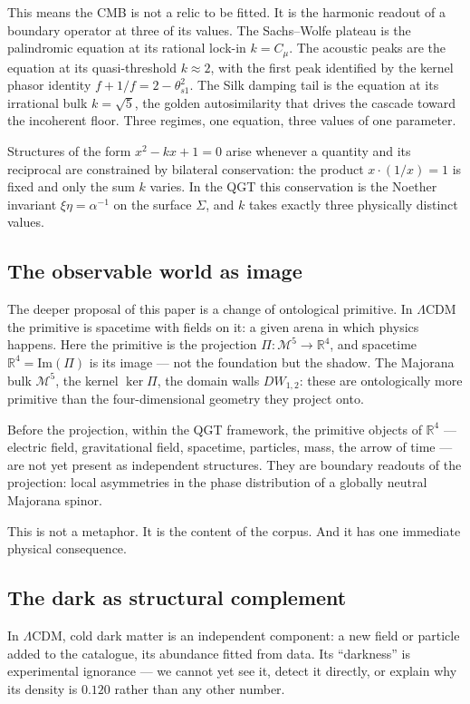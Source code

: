 \documentclass[twocolumn,10pt]{article}
\newcommand{\Mfive}{\mathcal{M}^5}
\newcommand{\Rfour}{\mathbb{R}^4}
\newcommand{\kerPi}{\ker\Pi}
\begin{document}
This means the CMB is not a relic to be fitted. It is the harmonic
readout of a boundary operator at three of its values. The Sachs--Wolfe
plateau is the palindromic equation at its rational lock-in
$k=C_\mu$. The acoustic peaks are the equation at its quasi-threshold
$k\approx2$, with the first peak identified by the kernel phasor
identity $f+1/f=2-\theta_{s1}^2$. The Silk damping tail is the
equation at its irrational bulk $k=\sqrt{5}$, the golden autosimilarity
that drives the cascade toward the incoherent floor. Three regimes,
one equation, three values of one parameter.

Structures of the form $x^2-kx+1=0$ arise whenever a quantity
and its reciprocal are constrained by bilateral conservation: the
product $x\cdot(1/x)=1$ is fixed and only the sum $k$ varies.
In the QGT this conservation is the Noether invariant
$\xi\eta=\alpha^{-1}$ on the surface $\Sigma$, and $k$ takes
exactly three physically distinct values.

\subsection{The observable world as image}

The deeper proposal of this paper is a change of ontological
primitive. In $\Lambda$CDM the primitive is spacetime with fields on
it: a given arena in which physics happens. Here the primitive is
the projection $\Pi:\Mfive\to\Rfour$, and spacetime $\Rfour =
\mathrm{Im}(\Pi)$ is its image — not the foundation but the shadow.
The Majorana bulk $\Mfive$, the kernel $\kerPi$, the domain walls
$DW_{1,2}$: these are ontologically more primitive than the
four-dimensional geometry they project onto.

Before the projection, within the QGT framework, the primitive objects
of $\Rfour$ — electric field, gravitational field, spacetime, particles,
mass, the arrow of time — are not yet present as independent structures.
They are boundary readouts of the projection: local asymmetries in the
phase distribution of a globally neutral Majorana spinor.

This is not a metaphor. It is the content of the corpus. And it has
one immediate physical consequence.

\subsection{The dark as structural complement}

In $\Lambda$CDM, cold dark matter is an independent component: a new
field or particle added to the catalogue, its abundance fitted from
data. Its ``darkness'' is experimental ignorance — we cannot yet see
it, detect it directly, or explain why its density is $0.120$ rather
than any other number.
\end{document}
